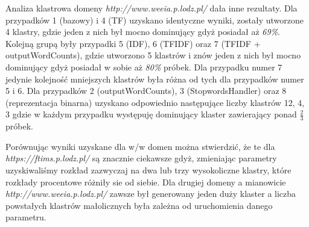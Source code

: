 \documentclass{classrep}
\begin{document}
{{            Analiza klastrowa domeny \textit{http://www.weeia.p.lodz.pl/} dała inne
            rezultaty. Dla przypadków 1 (bazowy) i 4 (TF) uzyskano identyczne wyniki,
            zostały utworzone 4 klastry, gdzie jeden z nich był mocno dominujący gdyż
            posiadał aż \textit{69\%}. Kolejną grupą były przypadki 5 (IDF), 6 (TFIDF)
            oraz 7 (TFIDF + outputWordCounts), gdzie utworzono 5 klastrów i znów jeden
            z nich był mocno dominujący gdyż posiadał w sobie aż \textit{80\%} próbek.
            Dla przypadku numer 7 jedynie kolejność mniejszych klastrów była różna od
            tych dla przypadków numer 5 i 6. Dla przypadków 2 (outputWordCounts),
            3 (StopwordsHandler) oraz 8 (reprezentacja binarna) uzyskano odpowiednio
            następujące liczby klastrów 12, 4, 3 gdzie w każdym przypadku występuję
            dominujący klaster zawierający ponad \(\frac{2}{3}\) próbek.

            Porównując wyniki uzyskane dla w/w domen można stwierdzić, że te dla
            \textit{https://ftims.p.lodz.pl/} są znacznie ciekawsze gdyż, zmieniając
            parametry uzyskiwaliśmy rozkład zazwyczaj na dwa lub trzy wysokoliczne
            klastry, które rozkłady procentowe różniły sie od siebie. Dla drugiej
            domeny a mianowicie \textit{http://www.weeia.p.lodz.pl/} zawsze był
            generowany jeden duży klaster a liczba powstałych klastrów małolicznych
            była zależna od uruchomienia danego parametru.
        }
    }

    \begin{thebibliography}{0}
    \end{thebibliography}
\end{document}
